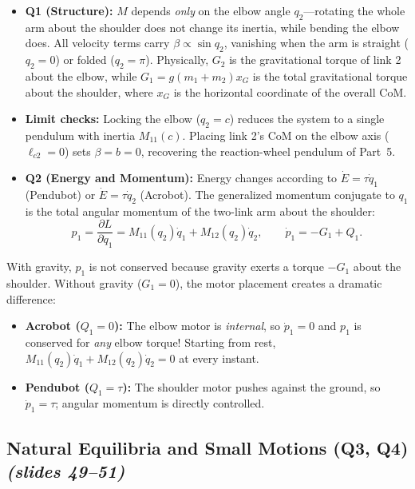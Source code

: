 \documentclass[11pt, a4paper]{article}
\theoremstyle{definition}
\theoremstyle{plain}
\begin{document}
\begin{itemize}
  \item \textbf{Q1 (Structure):} $M$ depends \emph{only} on the elbow angle $q_2$---rotating the whole arm about the shoulder does not change its inertia, while bending the elbow does. All velocity terms carry $\beta \propto \sin q_2$, vanishing when the arm is straight ($q_2=0$) or folded ($q_2=\pi$). Physically, $G_2$ is the gravitational torque of link 2 about the elbow, while $G_1 = g(m_1 + m_2) x_G$ is the total gravitational torque about the shoulder, where $x_G$ is the horizontal coordinate of the overall CoM.
  \item \textbf{Limit checks:} Locking the elbow ($q_2 = c$) reduces the system to a single pendulum with inertia $M_{11}(c)$. Placing link 2's CoM on the elbow axis ($\ell_{c2} = 0$) sets $\beta = b = 0$, recovering the reaction-wheel pendulum of Part~5.
  \item \textbf{Q2 (Energy and Momentum):} Energy changes according to $\dot{E} = \tau \dot{q}_1$ (Pendubot) or $\dot{E} = \tau \dot{q}_2$ (Acrobot). The generalized momentum conjugate to $q_1$ is the total angular momentum of the two-link arm about the shoulder:
  \[
    p_1 = \frac{\partial L}{\partial \dot{q}_1} = M_{11}(q_2)\dot{q}_1 + M_{12}(q_2)\dot{q}_2,
    \qquad \dot{p}_1 = -G_1 + Q_1.
  \]
\end{itemize}

\begin{intuition}
With gravity, $p_1$ is not conserved because gravity exerts a torque $-G_1$ about the shoulder. Without gravity ($G_1 = 0$), the motor placement creates a dramatic difference:
\begin{itemize}
  \item \textbf{Acrobot ($Q_1 = 0$):} The elbow motor is \emph{internal}, so $\dot{p}_1 = 0$ and $p_1$ is conserved for \emph{any} elbow torque! Starting from rest, $M_{11}(q_2)\dot{q}_1 + M_{12}(q_2)\dot{q}_2 = 0$ at every instant.
  \item \textbf{Pendubot ($Q_1 = \tau$):} The shoulder motor pushes against the ground, so $\dot{p}_1 = \tau$; angular momentum is directly controlled.
\end{itemize}
\end{intuition}

\subsection{Natural Equilibria and Small Motions (Q3, Q4) \emph{(slides 49--51)}}
\end{document}

